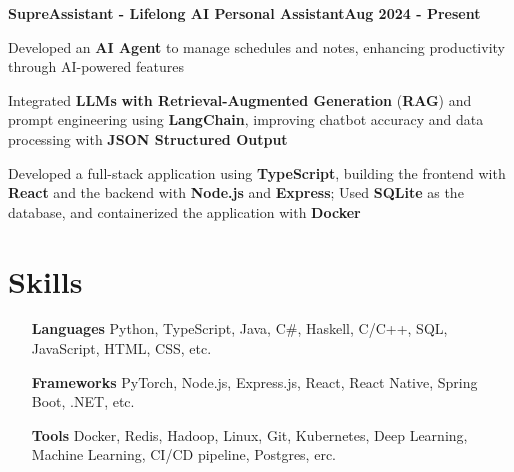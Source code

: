 \documentclass[letterpaper,10pt]{article}
\newcommand{\heading}[2]{
  \hspace{10pt}#1\hfill#2\\
}
\newcommand{\headingBf}[2]{
  \heading{\textbf{#1}}{\textbf{#2}}
}
\newenvironment{resume_list}{
  \vspace{-7pt}
  \begin{itemize}[itemsep=-2px, parsep=1pt, leftmargin=30pt]
}{
  \end{itemize}
}
\begin{document}
  \headingBf{SupreAssistant - Lifelong AI Personal Assistant}{Aug 2024 - Present}
  \begin{resume_list}
      \item Developed an \textbf{AI Agent} to manage schedules and notes, enhancing productivity through AI-powered features
      \item Integrated \textbf{LLMs} \textbf{with Retrieval-Augmented Generation} (\textbf{RAG}) and prompt engineering using \textbf{LangChain}, improving chatbot accuracy and data processing with \textbf{JSON Structured Output}
      \item Developed a full-stack application using \textbf{TypeScript}, building the frontend with \textbf{React} and the backend with \textbf{Node.js} and \textbf{Express}; Used \textbf{SQLite} as the database, and containerized the application with \textbf{Docker}
  \end{resume_list}
  
  

  \section{Skills}


    \begin{itemize}[itemsep=-2px, leftmargin=35pt, align=left]
        \item[\textbf{Languages}] Python, TypeScript, Java, C\#, Haskell, C/C++, SQL, JavaScript, HTML, CSS, etc.

\item[\textbf{Frameworks}] PyTorch, Node.js, Express.js, React, React Native, Spring Boot, .NET, etc.

\item[\textbf{Tools}] Docker, Redis, Hadoop, Linux, Git, Kubernetes, Deep Learning, Machine Learning, CI/CD pipeline, Postgres, erc.

    \end{itemize}
\end{document}
